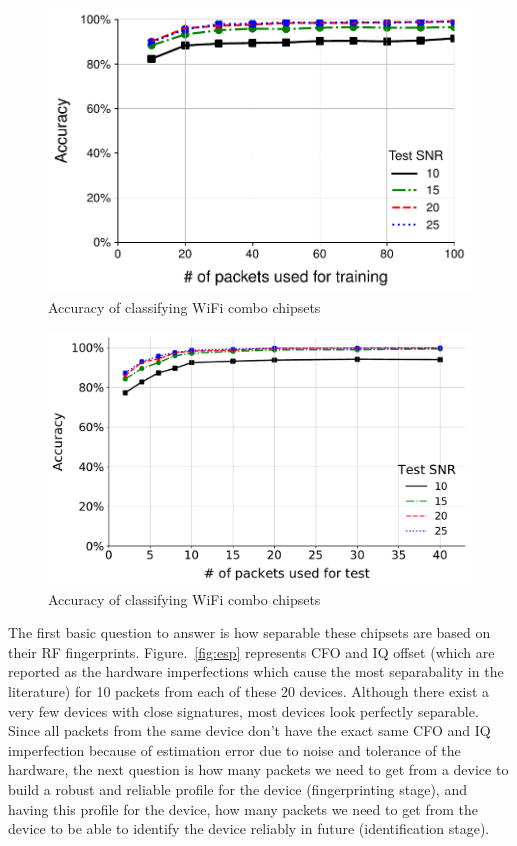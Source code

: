 \begin{figure}[t!]
    \centering
    \includegraphics[width=\linewidth]{plots/accuracy_esp_train.pdf}
    \caption{Accuracy of classifying WiFi combo chipsets}
    \label{fig:esp_train}
\end{figure}

\begin{figure}[t!]
    \centering
    \includegraphics[width=\linewidth]{plots/accuracy_esp_test.pdf}
    \caption{Accuracy of classifying WiFi combo chipsets}
    \label{fig:esp_test}
\end{figure}

The first basic question to answer is how separable these chipsets are based on their RF fingerprints. Figure.~\ref{fig:esp} represents CFO and IQ offset (which are reported as the hardware imperfections which cause the most separabality in the literature) for 10 packets from each of these 20 devices. Although there exist a very few devices with close signatures, most devices look perfectly separable. Since all packets from the same device don't have the exact same CFO and IQ imperfection because of estimation error due to noise and tolerance of the hardware, the next question is how many packets we need to get from a device to build a robust and reliable profile for the device (fingerprinting stage), and having this profile for the device, how many packets we need to get from the device to be able to identify the device reliably in future (identification stage). 

